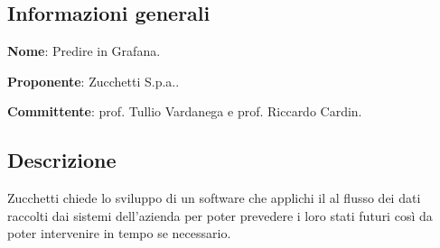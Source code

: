 \documentclass[../studio-di-fattibilita.tex]{subfiles}
\begin{document}
\subsection{Informazioni generali}%
\label{sub:informazioni_generale}
\begin{description}
  \item \textbf{Nome}: Predire in Grafana.
  \item \textbf{Proponente}: Zucchetti S.p.a..
  \item \textbf{Committente}: prof. Tullio Vardanega e prof. Riccardo Cardin.
\end{description}

\subsection{Descrizione}%
\label{sub:descrizione}
Zucchetti chiede lo sviluppo di un software che applichi il  al flusso dei dati raccolti dai sistemi dell’azienda per poter prevedere i loro stati futuri così da poter intervenire in tempo se necessario.
\end{document}
